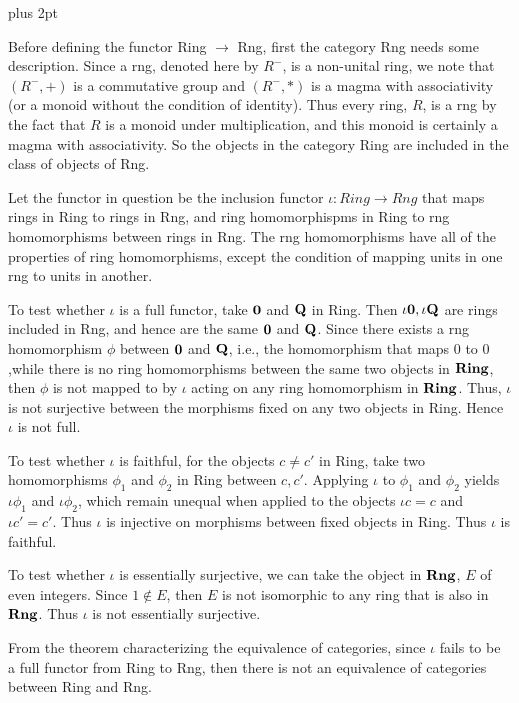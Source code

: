 \documentclass{article}
\def\addpunct#1{%
	\relax\ifhmode
	\ifnum\spacefactor>1000 \else#1\fi
\fi}
\renewenvironment{proof}[1][\proofname]{\par
  \pushQED{\qed}%
  \normalfont \topsep4pt plus 2pt\relax
  \list{}{\leftmargin=1em
          \rightmargin=1em%
          \settowidth{\itemindent}{\itshape#1}%
          \labelwidth=\itemindent
          \parsep=9pt plus3pt minus2pt
		  \listparindent=\parindent 
  }
  \item[\hskip\labelsep
        \itshape
    #1\addpunct{.}]\ignorespaces
}{%
  \popQED\endlist
}
\begin{document}
	\begin{proof}
Before defining the functor Ring $\rightarrow$ Rng, first the category Rng needs some description. Since a rng, denoted here by $R^-$, is a non-unital ring, we note that $(R^-,+)$ is a commutative group and $(R^-,*)$ is a magma with associativity (or a monoid without the condition of identity). Thus every ring, $R$, is a rng by the fact that $R$ is a monoid under multiplication, and this monoid is certainly a magma with associativity. So the objects in the category Ring are included in the class of objects of Rng. 

Let the functor in question be the inclusion functor $\iota: Ring\rightarrow Rng$ that maps rings in Ring to rings in Rng, and ring homomorphispms in Ring to rng homomorphisms between rings in Rng. The rng homomorphisms have all of the properties of ring homomorphisms, except the condition of mapping units in one rng to units in another. 

To test whether $\iota$ is a full functor, take $\bold 0$ and  $\bold Q$ in Ring. Then $\iota \bold 0, \iota \bold Q$ are rings included in Rng, and hence are the same $\bold 0$ and  $\bold Q$. Since there exists a rng homomorphism $\phi$ between $\bold 0$ and $\bold Q$, i.e., the homomorphism that maps $0$ to $0$,while there is no ring homomorphisms between the same two objects in $\bold {Ring}$, then $\phi$ is not mapped to by $\iota$ acting on any ring homomorphism in $\bold {Ring}$.  Thus, $\iota$ is not surjective between the morphisms fixed on any two objects in Ring. Hence $\iota$ is not full.

To test whether $\iota$ is faithful, for the objects $c \not= c'$ in Ring, take two homomorphisms $\phi_1$ and $\phi_2$ in Ring between $c, c'$. Applying $\iota$ to $\phi_1$ and $\phi_2$ yields $\iota \phi_1$ and $\iota \phi_2$, which remain unequal when applied to the objects $\iota c = c$ and $\iota c' = c'$. Thus $\iota$ is injective on morphisms between fixed objects in Ring. Thus $\iota$ is faithful.

To test whether $\iota$ is essentially surjective, we can take the object in $\bold {Rng}$, $E$ of even integers. Since $1 \notin E$, then $E$ is not isomorphic to any ring that is also in $\bold {Rng}$. Thus $\iota$ is not essentially surjective.

From the theorem characterizing the equivalence of categories, since $\iota$ fails to be a full functor from Ring to Rng, then there is not an equivalence of categories between Ring and Rng. 

	
\end{proof}	
	
	
\end{document}
